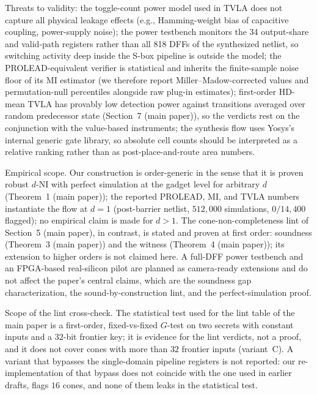 \documentclass[journal,onecolumn]{IEEEtran}
\begin{document}
Threats to validity: the toggle-count power model used in TVLA does
not capture all physical leakage effects (e.g., Hamming-weight bias
of capacitive coupling, power-supply noise); the power testbench
monitors the 34 output-share and valid-path registers
rather than all 818 DFFs of the synthesized netlist, so
switching activity deep inside the S-box pipeline is outside the
model; the PROLEAD-equivalent
verifier is statistical and inherits the finite-sample noise floor of
its MI estimator (we therefore report Miller--Madow-corrected values
and permutation-null percentiles alongside raw plug-in estimates);
first-order HD-mean TVLA has provably low detection power against
transitions averaged over random predecessor state
(Section~7 (main paper)), so the verdicts rest on the conjunction
with the value-based instruments;
the synthesis flow uses Yosys's internal generic
gate library, so absolute cell counts should be interpreted as a
relative ranking rather than as post-place-and-route area numbers.

Empirical scope. Our construction is order-generic in the sense
that it is proven robust $d$-NI with perfect simulation at the gadget level for
arbitrary $d$ (Theorem~1 (main paper)); the
reported PROLEAD, MI, and TVLA numbers instantiate the flow at
$d{=}1$ (post-barrier netlist, $512{,}000$ simulations, $0/14{,}400$
flagged); no empirical claim is made for $d{>}1$.  The cone-non-completeness lint of
Section~5 (main paper), in contrast, is stated and proven at first order: soundness (Theorem~3 (main paper)) and the
witness (Theorem~4 (main paper)); its extension to higher orders is
not claimed here.  A full-DFF power testbench and an
FPGA-based real-silicon pilot are planned as camera-ready extensions and
do not affect the paper's central claims, which are the soundness gap
characterization, the sound-by-construction lint, and the
perfect-simulation proof.

Scope of the lint cross-check. The statistical test used for the lint
table of the main paper is a first-order, fixed-vs-fixed $G$-test on two
secrets with constant inputs and a $32$-bit frontier key; it is evidence for
the lint verdicts, not a proof, and it does not cover cones with more than
$32$ frontier inputs (variant~C). A variant that bypasses the single-domain
pipeline registers is not reported: our re-implementation of that bypass does
not coincide with the one used in earlier drafts, flags $16$ cones, and none of
them leaks in the statistical test.


\end{document}
